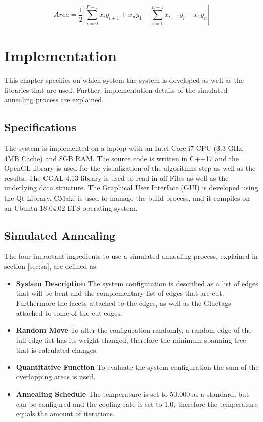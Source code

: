 \documentclass[draft,final]{vutinfth} %
\begin{document}
\begin{equation}
Area = \frac{1}{2} \left| \sum_{i=0}^{P-1} x_iy_{i+1} + x_ny_1 - \sum_{i=1}^{n-1} x_{i+1}y_i - x_1y_n \right|
\label{eq:shoelace}
\end{equation}

\chapter{Implementation}
\label{chap:Implementation}
This chapter specifies on which system the system is developed as well as the libraries that are used. Further, implementation details of the simulated annealing process are explained.

\section{Specifications}
The system is implemented on a laptop with an Intel Core i7 CPU (3.3 GHz, 4MB Cache) and 8GB RAM. The source code is written in C++17 and the OpenGL library is used for the visualization of the algorithms step as well as the results. The CGAL 4.13 library is used to read in off-Files as well as the underlying data structure. The Graphical User Interface (GUI) is developed using the Qt Library. CMake is used to manage the build process, and it compiles on an Ubuntu 18.04.02 LTS operating system.

\section{Simulated Annealing}
\label{sec:annealing}
The four important ingredients to use a simulated annealing process, explained in section \ref{sec:sa}, are defined as:
\begin{itemize}
	\item \textbf{System Description} The system configuration is described as a list of edges that will be bent and the complementary list of edges that are cut. Furthermore the facets attached to the edges, as well as the Gluetags attached to some of the cut edges.
	\item \textbf{Random Move} To alter the configuration randomly, a random edge of the full edge list has its weight changed, therefore the minimum spanning tree that is calculated changes.
	\item \textbf{Quantitative Function} To evaluate the system configuration the sum of the overlapping areas is used.
	\item \textbf{Annealing Schedule} The temperature is set to 50.000 as a standard, but can be configured and the cooling rate is set to 1.0, therefore the temperature equals the amount of iterations.
\end{itemize}
\end{document}
